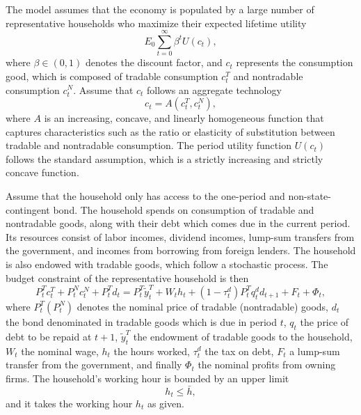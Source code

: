 The model assumes that the economy is populated by a large number of representative households who maximize their expected lifetime utility
\begin{equation}
    \label{eq:utility}
    E_0 \sum_{t=0}^\infty \beta^t U(c_t),
\end{equation}
where $\beta \in(0,1)$ denotes the discount factor,
and $c_t$ represents the consumption good, which is composed of
tradable consumption $c_t^T$ and nontradable consumption $c_t^N$.
Assume that $c_t$ follows an aggregate technology
\begin{equation}
    \label{eq:A}
    c_t = A(c^T_t, c^N_t),
\end{equation}
where $A$ is an increasing, concave, and linearly homogeneous function that captures characteristics such as the ratio or elasticity of substitution between tradable and nontradable consumption.
The period utility function $U(c_t)$ follows the standard assumption, which is a strictly increasing and strictly concave function.

Assume that the household only has access to the one-period and non-state-contingent bond.
The household spends on consumption of tradable and nontradable goods, along with their debt which comes due in the current period. Its resources consist of labor incomes, dividend incomes, lump-sum transfers from the government, and incomes from borrowing from foreign lenders. The household is also endowed with tradable goods, which follow a stochastic process.
The budget constraint of the representative household is then
\begin{equation}
    \label{eq:bc}
    P^T_t c^T_t + P^N_t c^N_t + P^T_t d_t =
    P^T_t \tilde{y}^T_t + W_t h_t + (1- \tau^d_t)P^T_t q^d_t d_{t+1} + F_t + \Phi_t,
\end{equation}
where $P^T_t (P^N_t)$ denotes the nominal price of tradable (nontradable) goods, $d_t$ the bond denominated in tradable goods which is due in period $t$, $q_t$ the price of debt to be repaid at $t+1$, $\tilde{y}^T_t$ the endowment of tradable goods to the household, $W_t$ the nominal wage, $h_t$ the hours worked, $\tau^d_t$ the tax on debt, $F_t$ a lump-sum transfer from the government, and finally $\Phi_t$ the nominal profits from owning firms.
The household's working hour is bounded by an upper limit
\begin{equation}
    \label{eq:h-constraint}
    h_t \le \bar{h},
\end{equation}
and it takes the working hour $h_t$ as given.

